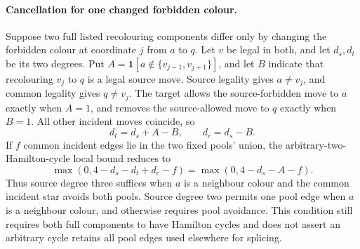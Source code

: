 \paragraph{Cancellation for one changed forbidden colour.}
Suppose two full listed recolouring components differ only by changing
the forbidden colour at coordinate $j$ from $a$ to $q$.
Let $v$ be legal in both, and let $d_s,d_t$ be its two degrees.
Put $A=\mathbf1[a\notin\{v_{j-1},v_{j+1}\}]$, and let $B$ indicate
that recolouring $v_j$ to $q$ is a legal source move.
Source legality gives $a\ne v_j$, and common legality gives $q\ne v_j$.
The target allows the source-forbidden move to $a$ exactly when $A=1$,
and removes the source-allowed move to $q$ exactly when $B=1$.
All other incident moves coincide, so
\[
d_t=d_s+A-B,\qquad d_c=d_s-B.
\]
If $f$ common incident edges lie in the two fixed pools' union, the
arbitrary-two-Hamilton-cycle local bound reduces to
\[
\max(0,4-d_s-d_t+d_c-f)=\max(0,4-d_s-A-f).
\]
Thus source degree three suffices when $a$ is a neighbour colour and
the common incident star avoids both pools. Source degree two permits
one pool edge when $a$ is a neighbour colour, and otherwise requires
pool avoidance. This condition still requires both full components
to have Hamilton cycles and does not assert an arbitrary cycle retains
all pool edges used elsewhere for splicing.

